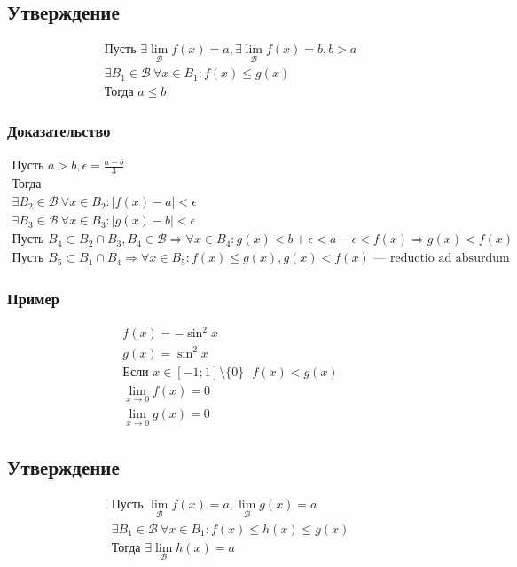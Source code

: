 \documentclass{article}
\begin{document}
\subsection{Утверждение}
\begin{gather*}
    \text{Пусть } \exists \lim_{\mathcal{B}} f(x) = a, \exists \lim_{\mathcal{B}} f(x) = b, b > a \\
    \exists B_1 \in \mathcal{B} ~ \forall x \in B_1: f(x) \le g(x) \\
    \text{Тогда } a \le b
\end{gather*}

\subsubsection{Доказательство}
\begin{gather*}
    \text{Пусть } a > b, \epsilon = \frac{a - b}{3} \\
    \text{Тогда } \\
    \exists B_2 \in \mathcal{B} ~ \forall x \in B_2: |f(x) - a| < \epsilon \\
    \exists B_3 \in \mathcal{B} ~ \forall x \in B_3: |g(x) - b| < \epsilon \\
    \text{Пусть } B_4 \subset B_2 \cap B_3, B_4 \in \mathcal{B} \Rightarrow \forall x \in B_4: g(x) < b + \epsilon < a - \epsilon < f(x) \Rightarrow g(x) < f(x) \\
    \text{Пусть } B_5 \subset B_1 \cap B_4 \Rightarrow \forall x \in B_5: f(x) \le g(x), g(x) < f(x) \text{ --- reductio ad absurdum}
\end{gather*}

\subsubsection{Пример}
\begin{gather*}
    f(x) = -\sin^2 x \\
    g(x) =  \sin^2 x \\
    \text{Если } x \in [-1; 1] \setminus \{0\} ~~~ f(x) < g(x) \\
    \lim_{x \to 0} f(x) = 0 \\
    \lim_{x \to 0} g(x) = 0
\end{gather*}


\subsection{Утверждение}
\begin{gather*}
    \text{Пусть } \lim_{\mathcal{B}} f(x) = a, \lim_{\mathcal{B}} g(x) = a \\
    \exists B_1 \in \mathcal{B} ~ \forall x \in B_1: f(x) \le h(x) \le g(x) \\
    \text{Тогда } \exists \lim_{\mathcal{B}} h(x) = a
\end{gather*}
\end{document}
